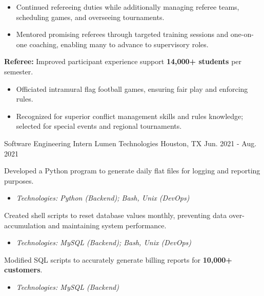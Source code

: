 \begin{cventries}
{\begin{cvitems}
{      \begin{itemize}
      \item Continued refereeing duties while additionally managing referee teams, scheduling games, and overseeing tournaments.
      \item Mentored promising referees through targeted training sessions and one-on-one coaching, enabling many to advance to supervisory roles.
      \end{itemize}
      }
      \item{
      \textbf{Referee:} Improved participant experience support \textbf{14,000+ students} per semester.
      \begin{itemize}
      \item Officiated intramural flag football games, ensuring fair play and enforcing rules.
      \item Recognized for superior conflict management skills and rules knowledge; selected for special events and regional tournaments.
      \end{itemize}
      }
    \end{cvitems}
  }
  \vspace{3mm}
  \cventry
    {Software Engineering Intern} %
    {Lumen Technologies} %
    {Houston, TX} %
    {Jun. 2021 - Aug. 2021} %
    {
      \begin{cvitems} %
      \item {Developed a Python program to generate daily flat files for logging and reporting purposes.
      \begin{itemize}
      \item \textit{Technologies: Python (Backend); Bash, Unix (DevOps)}
      \end{itemize}
      }
      \item{Created shell scripts to reset database values monthly, preventing data over-accumulation and maintaining system performance.
      \begin{itemize}
      \item \textit{Technologies: MySQL (Backend); Bash, Unix (DevOps)}
      \end{itemize}
      }
      \item {Modified SQL scripts to accurately generate billing reports for \textbf{10,000+ customers}.
      \begin{itemize}
      \item \textit{Technologies: MySQL (Backend)}
      \end{itemize}
      }
      \end{cvitems}
    }
\end{cventries}

